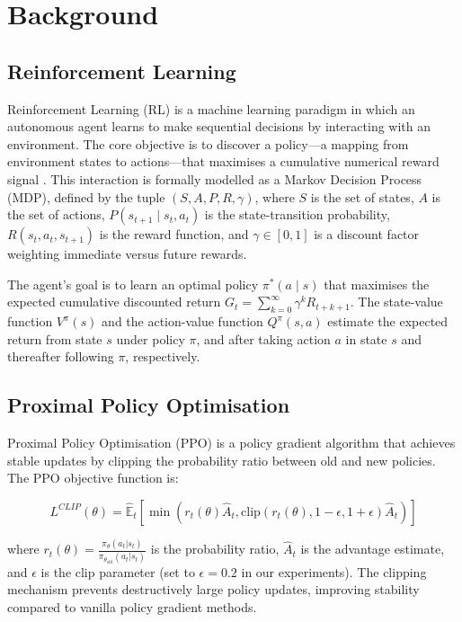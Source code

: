 \documentclass[../report.tex]{subfiles}
\begin{document}
    \section{Background}
    \label{sec:background}

    \subsection{Reinforcement Learning}

    Reinforcement Learning (RL) is a machine learning paradigm in which an autonomous agent learns to make sequential decisions by interacting with an environment. The core objective is to discover a policy—a mapping from environment states to actions—that maximises a cumulative numerical reward signal \cite{Lin2020}. This interaction is formally modelled as a Markov Decision Process (MDP), defined by the tuple $(S, A, P, R, \gamma)$, where $S$ is the set of states, $A$ is the set of actions, $P(s_{t+1} \mid s_t, a_t)$ is the state-transition probability, $R(s_t, a_t, s_{t+1})$ is the reward function, and $\gamma \in [0,1]$ is a discount factor weighting immediate versus future rewards.

    The agent's goal is to learn an optimal policy $\pi^*(a \mid s)$ that maximises the expected cumulative discounted return $G_t = \sum_{k=0}^{\infty} \gamma^k R_{t+k+1}$. The state-value function $V^{\pi}(s)$ and the action-value function $Q^{\pi}(s, a)$ estimate the expected return from state $s$ under policy $\pi$, and after taking action $a$ in state $s$ and thereafter following $\pi$, respectively.

    \subsection{Proximal Policy Optimisation}

    Proximal Policy Optimisation (PPO) \cite{Schulman2017} is a policy gradient algorithm that achieves stable updates by clipping the probability ratio between old and new policies. The PPO objective function is:

    \begin{equation}
        L^{CLIP}(\theta) = \hat{\mathbb{E}}_t \left[ \min\left( r_t(\theta) \hat{A}_t, \text{clip}(r_t(\theta), 1-\epsilon, 1+\epsilon) \hat{A}_t \right) \right]
        \label{eq:ppo}
    \end{equation}

    where $r_t(\theta) = \frac{\pi_\theta(a_t|s_t)}{\pi_{\theta_{\text{old}}}(a_t|s_t)}$ is the probability ratio, $\hat{A}_t$ is the advantage estimate, and $\epsilon$ is the clip parameter (set to $\epsilon = 0.2$ in our experiments). The clipping mechanism prevents destructively large policy updates, improving stability compared to vanilla policy gradient methods.
\end{document}
